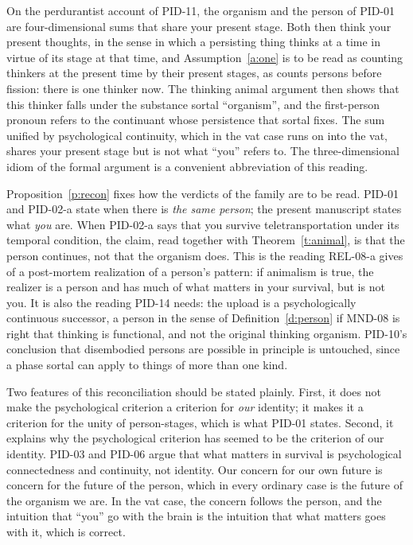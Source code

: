 \documentclass{situationist-preprint}
\begin{document}
\begin{remark}\label{r:perd}
On the perdurantist account of PID-11, the organism and the person of PID-01 are four-dimensional sums that share your present stage. Both then think your present thoughts, in the sense in which a persisting thing thinks at a time in virtue of its stage at that time, and Assumption~\ref{a:one} is to be read as counting thinkers at the present time by their present stages, as \citet{Lewis1976} counts persons before fission: there is one thinker now. The thinking animal argument then shows that this thinker falls under the substance sortal \enquote{organism}, and the first-person pronoun refers to the continuant whose persistence that sortal fixes. The sum unified by psychological continuity, which in the vat case runs on into the vat, shares your present stage but is not what \enquote{you} refers to. The three-dimensional idiom of the formal argument is a convenient abbreviation of this reading.
\end{remark}

Proposition~\ref{p:recon} fixes how the verdicts of the family are to be read. PID-01 and PID-02-a state when there is \emph{the same person}; the present manuscript states what \emph{you} are. When PID-02-a says that you survive teletransportation under its temporal condition, the claim, read together with Theorem~\ref{t:animal}, is that the person continues, not that the organism does. This is the reading REL-08-a gives of a post-mortem realization of a person's pattern: if animalism is true, the realizer is a person and has much of what matters in your survival, but is not you. It is also the reading PID-14 needs: the upload is a psychologically continuous successor, a person in the sense of Definition~\ref{d:person} if MND-08 is right that thinking is functional, and not the original thinking organism. PID-10's conclusion that disembodied persons are possible in principle is untouched, since a phase sortal can apply to things of more than one kind.

Two features of this reconciliation should be stated plainly. First, it does not make the psychological criterion a criterion for \emph{our} identity; it makes it a criterion for the unity of person-stages, which is what PID-01 states. Second, it explains why the psychological criterion has seemed to be the criterion of our identity. PID-03 and PID-06 argue that what matters in survival is psychological connectedness and continuity, not identity. Our concern for our own future is concern for the future of the person, which in every ordinary case is the future of the organism we are. In the vat case, the concern follows the person, and the intuition that \enquote{you} go with the brain is the intuition that what matters goes with it, which is correct.
\end{document}

